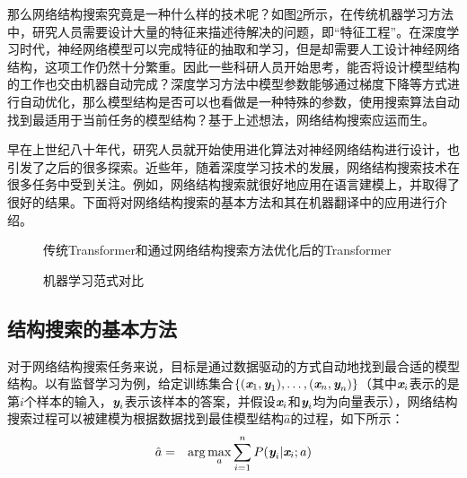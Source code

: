 \parinterval 那么网络结构搜索究竟是一种什么样的技术呢？如图\ref{fig:15-28}所示，在传统机器学习方法中，研究人员需要设计大量的特征来描述待解决的问题，即“特征工程”。在深度学习时代，神经网络模型可以完成特征的抽取和学习，但是却需要人工设计神经网络结构，这项工作仍然十分繁重。因此一些科研人员开始思考，能否将设计模型结构的工作也交由机器自动完成？深度学习方法中模型参数能够通过梯度下降等方式进行自动优化，那么模型结构是否可以也看做是一种特殊的参数，使用搜索算法自动找到最适用于当前任务的模型结构？基于上述想法，网络结构搜索应运而生。

\parinterval 早在上世纪八十年代，研究人员就开始使用进化算法对神经网络结构进行设计，也引发了之后的很多探索。近些年，随着深度学习技术的发展，网络结构搜索技术在很多任务中受到关注。例如，网络结构搜索就很好地应用在语言建模上，并取得了很好的结果。下面将对网络结构搜索的基本方法和其在机器翻译中的应用进行介绍。

\begin{figure}[htp]
\centering

\caption{传统Transformer和通过网络结构搜索方法优化后的Transformer}
\label{fig:15-27}
\end{figure}

\begin{figure}[htp]
\centering

\caption{机器学习范式对比}
\label{fig:15-28}
\end{figure}


\subsection{结构搜索的基本方法}

\parinterval 对于网络结构搜索任务来说，目标是通过数据驱动的方式自动地找到最合适的模型结构。以有监督学习为例，给定训练集合$\{(\textbf{\em x}_{1},\textbf{\em y}_{1}),\ldots,(\textbf{\em x}_{n},\textbf{\em y}_{n})\}$（其中$\textbf{\em x}_{i}$表示的是第$i$个样本的输入，$\textbf{\em y}_{i}$表示该样本的答案，并假设$\textbf{\em x}_{i}$和$\textbf{\em y}_{i}$均为向量表示），网络结构搜索过程可以被建模为根据数据找到最佳模型结构$\hat{a}$的过程，如下所示：
\begin{eqnarray}
\hat{a} &=& \arg\max_{a}\sum_{i=1}^{n}{{P}(\textbf{\em y}_{i}|\textbf{\em x}_{i};a)}
\label{eq:15-57}
\end{eqnarray}

